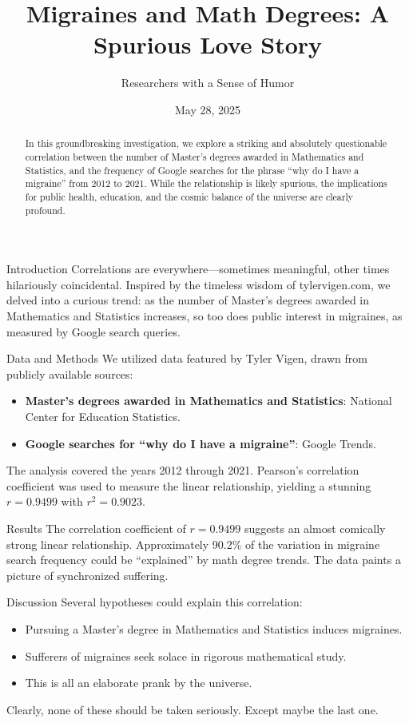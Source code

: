 \documentclass{article}
\title{\textbf{Migraines and Math Degrees: A Spurious Love Story}}
\author{Researchers with a Sense of Humor}
\date{May 28, 2025}
\begin{document}
\maketitle

\begin{abstract}
  In this groundbreaking investigation, we explore a striking and absolutely questionable correlation between the number of Master's degrees awarded in Mathematics and Statistics, and the frequency of Google searches for the phrase ``why do I have a migraine'' from 2012 to 2021. While the relationship is likely spurious, the implications for public health, education, and the cosmic balance of the universe are clearly profound.
\end{abstract}

\begin{section}{Introduction}
 Correlations are everywhere---sometimes meaningful, other times hilariously coincidental. Inspired by the timeless wisdom of tylervigen.com, we delved into a curious trend: as the number of Master's degrees awarded in Mathematics and Statistics increases, so too does public interest in migraines, as measured by Google search queries.
\end{section}

\begin{section}{Data and Methods}
 We utilized data featured by Tyler Vigen, drawn from publicly available sources:
 \begin{itemize}
   \item \textbf{Master's degrees awarded in Mathematics and Statistics}: National Center for Education Statistics.
   \item \textbf{Google searches for ``why do I have a migraine''}: Google Trends.
 \end{itemize}
 The analysis covered the years 2012 through 2021. Pearson's correlation coefficient was used to measure the linear relationship, yielding a stunning $r = 0.9499$ with $r^2 = 0.9023$.
\end{section}

\begin{section}{Results}
 The correlation coefficient of $r = 0.9499$ suggests an almost comically strong linear relationship. Approximately 90.2\% of the variation in migraine search frequency could be ``explained'' by math degree trends. The data paints a picture of synchronized suffering.
\end{section}

\begin{section}{Discussion}
 Several hypotheses could explain this correlation:
 \begin{itemize}
   \item Pursuing a Master's degree in Mathematics and Statistics induces migraines.
   \item Sufferers of migraines seek solace in rigorous mathematical study.
   \item This is all an elaborate prank by the universe.
 \end{itemize}
 Clearly, none of these should be taken seriously. Except maybe the last one.
\end{section}
\end{document}
